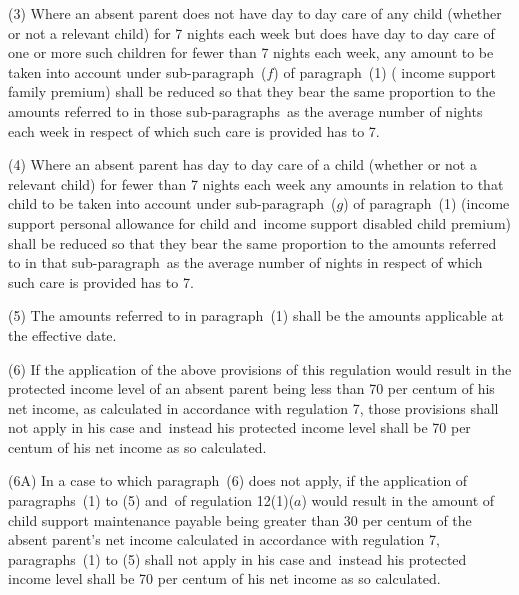 \documentclass[12pt,a4paper]{article}
\begin{document}
(3) Where an absent parent does not have day to day care of any child (whether or not a relevant child) for 7 nights each week but does have day to day care of one or more such children for fewer than 7 nights each week, 
any amount  %
to be taken into account under 
sub-paragraph~($f$)  %
of paragraph~(1) (%
income support family premium) shall be reduced so that they bear the same proportion to the amounts referred to in those sub-paragraphs~as the average number of nights each week in respect of which such care is provided has to 7.

(4) Where an absent parent has day to day care of a child (whether or not a relevant child) for fewer than 7 nights each week any amounts in relation to that child to be taken into account under sub-paragraph~($g$) of paragraph~(1) (income support personal allowance for child and~income support disabled child premium) shall be reduced so that they bear the same proportion to the amounts referred to in that sub-paragraph~as the average number of nights in respect of which such care is provided has to 7.

(5) The amounts referred to in paragraph~(1) shall be the amounts applicable at the effective date.

(6) If the application of the above provisions of this regulation would result in the protected income level of an absent parent being less than 70 per centum of his net income, as calculated in accordance with regulation 7, those provisions shall not apply in his case and~instead his protected income level shall be 70 per centum of his net income as so calculated.

(6A) In a case to which paragraph~(6) does not apply, if the application of paragraphs~(1) to (5) and~of regulation 12(1)($a$) would result in the amount of child support maintenance payable being greater than 30 per centum of the absent parent’s net income calculated in accordance with regulation 7, paragraphs~(1) to (5) shall not apply in his case and~instead his protected income level shall be 70 per centum of his net income as so calculated.
\end{document}
